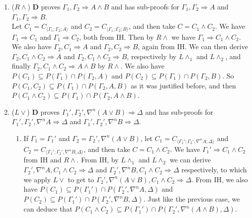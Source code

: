 \begin{enumerate}
	\item ($R\land$) $\mathbf{D}$ proves $\Gamma_1 , \Gamma_2 \Rightarrow A \land B$ and has sub-proofs for $\Gamma_1 , \Gamma_2 \Rightarrow A$ and $\Gamma_1 , \Gamma_2 \Rightarrow B$.\\
	Let $C_1 = C_{\langle\Gamma_1;\Gamma_2;A\rangle}$ and $C_2 = C_{\langle\Gamma_1;\Gamma_2;B\rangle}$, and then take $C = C_1 \land C_2$.
	We have $\Gamma_1 \Rightarrow C_1$ and $\Gamma_1 \Rightarrow C_2$, both from IH. Then by $R\land$ we have $\Gamma_1 \Rightarrow C_1 \land C_2$.
	We also have $\Gamma_2 , C_1 \Rightarrow A$ and $\Gamma_2 , C_2 \Rightarrow B$, again from IH.
	We can then derive $\Gamma_2 , C_1 \land C_2 \Rightarrow A$ and $\Gamma_2 , C_1 \land C_2 \Rightarrow B$, respectively by $L\land_1$ and $L\land_2$, and finally  $\Gamma_2 , C_1 \land C_2 \Rightarrow A \land B$ by $R\land$.
	We also have $P(C_1) \subseteq P(\Gamma_1) \cap P(\Gamma_2 , A)$ and $P(C_2) \subseteq P(\Gamma_1) \cap P(\Gamma_2 , B)$. So $P(C_1 , C_2) \subseteq P(\Gamma_1) \cap P(\Gamma_2 , A , B)$ as it was justified before, and then $P(C_1 \land C_2) \subseteq P(\Gamma_1) \cap P(\Gamma_2 , A \land B)$.
	
	\item ($L\lor$) $\mathbf{D}$ proves $\Gamma_1' , \Gamma_2' , \nabla^n (A \lor B) \Rightarrow \Delta$ and has sub-proofs for $\Gamma_1' , \Gamma_2' , \nabla^n A \Rightarrow \Delta$ and $\Gamma_1' , \Gamma_2' , \nabla^n B \Rightarrow \Delta$.
	\begin{enumerate}
		\item If $\Gamma_1 = \Gamma_1'$ and $\Gamma_2 = \Gamma_2' , \nabla^n (A \lor B)$, let $C_1 = C_{\langle\Gamma_1';\Gamma_2',\nabla^n A;\Delta\rangle}$ and $C_2 = C_{\langle\Gamma_1';\Gamma_2',\nabla^n B;\Delta\rangle}$, and then take $C = C_1 \land C_2$.
		We have $\Gamma_1' \Rightarrow C_1 \land C_2$ from IH and $R\land$.
		From IH, by $L\land_1$ and $L\land_2$ we can derive $\Gamma_2' , \nabla^n A , C_1 \land C_2 \Rightarrow \Delta$ and $\Gamma_2' , \nabla^n B , C_1 \land C_2 \Rightarrow \Delta$ respectively, to which we apply $L\lor$ to get to $\Gamma_2' , \nabla^n (A \lor B) , C_1 \land C_2 \Rightarrow \Delta$.
		From IH, we also have $P(C_1) \subseteq P(\Gamma_1') \cap P(\Gamma_2' , \nabla^n A , \Delta)$ and $P(C_2) \subseteq P(\Gamma_1') \cap P(\Gamma_2' , \nabla^n B , \Delta)$. Just like the previous case, we can deduce that $P(C_1 \land C_2) \subseteq P(\Gamma_1') \cap P(\Gamma_2' , \nabla^n (A \land B) , \Delta)$.


\end{enumerate}
\end{enumerate}
